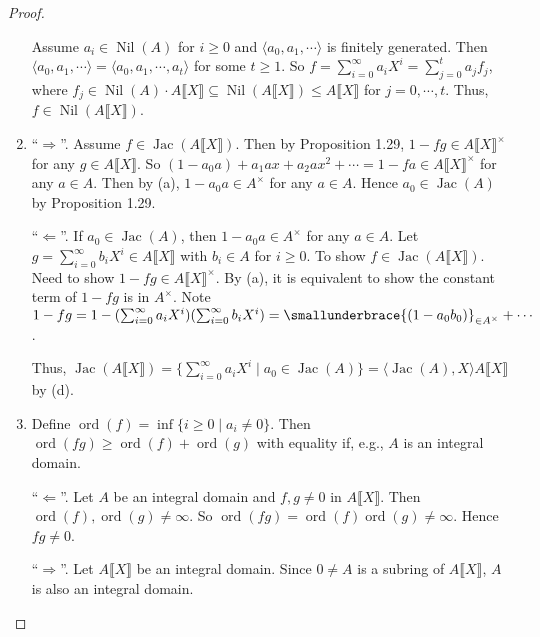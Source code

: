 \begin{proof}
\begin{enumerate}
            Assume $a_i \in \operatorname{Nil}(A)$ for $i \geq 0$ and $\langle a_0,a_1,\cdots \rangle$ is finitely generated. Then $\langle a_0,a_1,\cdots \rangle = \langle a_0,a_1,\cdots,a_t \rangle$ for some $t \geq 1$. So $f = \sum_{i=0}^\infty a_iX^i = \sum_{j=0}^t a_jf_j$, where $f_j \in \operatorname{Nil}(A) \cdot A \llbracket X \rrbracket \subseteq \operatorname{Nil}(A\llbracket X \rrbracket) \leq A\llbracket X \rrbracket$ for $j = 0,\cdots,t$. Thus, $f \in \operatorname{Nil}(A\llbracket X \rrbracket)$. 
        \item  ``$\Rightarrow$''. Assume $f \in \operatorname{Jac}(A\llbracket X \rrbracket)$. Then by Proposition 1.29, $1-fg \in A\llbracket X \rrbracket^\times$ for any $g \in A\llbracket X \rrbracket$. So $(1-a_0a) + a_1ax + a_2ax^2 + \cdots = 1-fa \in A\llbracket X \rrbracket^\times$ for any $a \in A$. Then by (a), $1-a_0a \in A^\times$ for any $a \in A$. Hence $a_0 \in \operatorname{Jac}(A)$ by Proposition 1.29. \par 
            ``$\Leftarrow$''. If $a_0 \in \operatorname{Jac}(A)$, then $1-a_0a \in A^\times$ for any $a \in A$. Let $g = \sum_{i=0}^\infty b_iX^i \in A\llbracket X \rrbracket$ with $b_i \in A$ for $i \geq 0$. To show $f \in \operatorname{Jac}(A\llbracket X \rrbracket)$. Need to show $1-fg \in A\llbracket X \rrbracket^\times$. By (a), it is equivalent to show the constant term of $1-fg$ is in $A^\times$. Note $1-fg = 1-(\sum_{i=0}^\infty a_iX^i)(\sum_{i=0}^\infty b_iX^i) = \smallunderbrace{(1-a_0b_0)}_{\in A^\times} + \cdots$. \par 
            Thus, $\operatorname{Jac}(A\llbracket X \rrbracket) = \{\sum_{i=0}^\infty a_iX^i \mid a_0 \in \operatorname{Jac}(A)\} = \langle \operatorname{Jac}(A),X \rangle A \llbracket X \rrbracket$ by (d). 
        \item 
            Define $\operatorname{ord}(f) = \inf\{i \geq 0 \mid a_i \neq 0\}$. Then $\operatorname{ord}(fg) \geq \operatorname{ord}(f) + \operatorname{ord}(g)$ with equality if, e.g., $A$ is an integral domain. \par 
            ``$\Leftarrow$''. Let $A$ be an integral domain and $f,g \neq 0$ in $A\llbracket X \rrbracket$. Then $\operatorname{ord}(f),\operatorname{ord}(g) \neq \infty$. So $\operatorname{ord}(fg) = \operatorname{ord}(f)\operatorname{ord}(g) \neq \infty$. Hence $fg \neq 0$. \par
            ``$\Rightarrow$''. Let $A\llbracket X \rrbracket$ be an integral domain. Since $0 \neq A$ is a subring of $A\llbracket X \rrbracket$, $A$ is also an integral domain. \par

\end{enumerate}
\end{proof}
